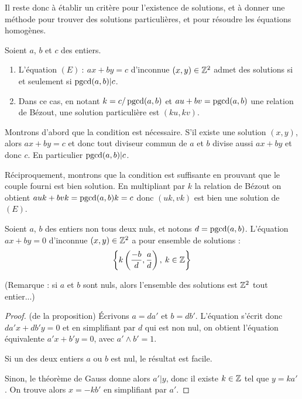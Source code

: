 Il reste donc à établir un critère pour l'existence de solutions, et à donner une méthode pour trouver des solutions particulières, et pour résoudre les équations homogènes.

\begin{proposition}
Soient $a$, $b$ et $c$ des entiers.
\begin{enumerate}
\item L'équation $(E)\: : \: ax+by=c$ d'inconnue $(x,y)\in \mathbb{Z}^2$ admet des solutions si et seulement si $\operatorname{pgcd}(a,b)|c$.
\item Dans ce cas, en notant $k=c/\operatorname{pgcd}(a,b)$ et $au+bv=\operatorname{pgcd}(a,b)$ une relation de Bézout, une solution particulière est $(ku,kv)$.
\end{enumerate}
\end{proposition}
\begin{preuve}
Montrons d'abord que la condition est nécessaire. S'il existe une solution $(x,y)$, alors $ax+by=c$ et donc tout diviseur commun de $a$ et $b$ divise aussi $ax+by$ et donc $c$. En  particulier $\operatorname{pgcd}(a,b) | c$.

Réciproquement, montrons que la condition est suffisante en prouvant que le couple fourni est bien solution. En multipliant par $k$ la relation de Bézout on obtient $auk+bvk=\operatorname{pgcd}(a,b) k=c$ donc $(uk,vk)$ est bien une solution de $(E)$.
\end{preuve}


\begin{proposition}
Soient $a$, $b$ des entiers non tous deux  nuls, et notons $d = \operatorname{pgcd}(a,b)$. L'équation $ax+by=0$ d'inconnue $(x,y)\in \mathbb{Z}^2$ a pour ensemble de solutions :
\[
\left\{k\left(\frac{-b}{d} , \frac{a}{d}\right),\: k\in \mathbb{Z}\right\}
\]
\end{proposition}

(Remarque : si $a$ et $b$ sont nuls, alors l'ensemble des solutions est $\mathbb{Z}^2$ tout entier...)

\begin{proof}(de la proposition)
\'Ecrivons $a=da'$ et $b=db'$. L'équation s'écrit donc $da'x+db'y=0$ et en simplifiant par $d$ qui est non nul, on obtient l'équation équivalente $a'x+b'y=0$, avec $a'\wedge b'=1$.

Si un des deux entiers $a$ ou $b$ est nul, le résultat est facile.

Sinon, le théorème de Gauss donne alors $a'|y$, donc il existe $k\in \mathbb{Z}$ tel que $y = ka'$.  On trouve alors $x=-kb'$ en simplifiant par $a'$.
\end{proof}

